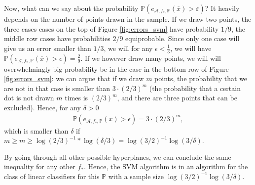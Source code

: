 \documentclass{article}
\newcommand{\calA}{\mathcal{A}}
\begin{document}
Now, what can we say about the probability $\mathbb{P}(e_{\mathcal{A},f_*,\mathbb{P}}(\overline{x}) > \varepsilon)$? It heavily depends on the number of points drawn in the sample. If we draw two points, the three cases cases on the top of Figure \ref{fig:errors_svm} have probability $1/9$, the middle row cases have probabilities $2/9$ equiprobable. Since only one case will give us an error smaller than $1/3$, we will for any $\epsilon<\frac{1}{3}$, we will have $ \mathbb{P}( e_{\calA,f_*,\mathbb{P}}(\overline{x}) >\epsilon)= \tfrac{2}{9}$. If we however draw many points, we will will overwhelmingly big probability be in the case in the bottom row of Figure \ref{fig:errors_svm}: we can argue that if we draw $m$ points, the probability that we are not in that case is smaller than $3\cdot (2/3)^m$ (the probability that a certain dot is not drawn $m$ times is $(2/3)^m$, and there are three points that can be excluded). Hence, for any $\delta>0$
\begin{align*}
    \mathbb{P}( e_{\calA,f_*,\mathbb{P}}(\overline{x}) >\epsilon)= 3\cdot (2/3)^m,
\end{align*}
which is smaller than $\delta$ if $m \geq m \geq \log(2/3)^{-1}*\log(\delta/3)= \log(3/2)^{-1}\log(3/\delta)$.


By going through all other possible hyperplanes, we can conclude the same inequality for any other $f_*$. Hence, the SVM algorithm is in an algorithm for the class of linear classifiers for this $\mathbb{P}$ with a sample size $\log(3/2)^{-1}\log(3/\delta)$.
\end{document}
